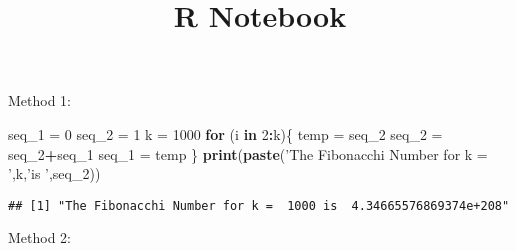 \documentclass[
]{article}
\title{R Notebook}
\author{}
\date{\vspace{-2.5em}}
\newenvironment{Shaded}{\begin{snugshade}}{\end{snugshade}}
\newcommand{\ControlFlowTok}[1]{\textcolor[rgb]{0.13,0.29,0.53}{\textbf{#1}}}
\newcommand{\DataTypeTok}[1]{\textcolor[rgb]{0.13,0.29,0.53}{#1}}
\newcommand{\DecValTok}[1]{\textcolor[rgb]{0.00,0.00,0.81}{#1}}
\newcommand{\KeywordTok}[1]{\textcolor[rgb]{0.13,0.29,0.53}{\textbf{#1}}}
\newcommand{\NormalTok}[1]{#1}
\newcommand{\OperatorTok}[1]{\textcolor[rgb]{0.81,0.36,0.00}{\textbf{#1}}}
\newcommand{\OtherTok}[1]{\textcolor[rgb]{0.56,0.35,0.01}{#1}}
\newcommand{\StringTok}[1]{\textcolor[rgb]{0.31,0.60,0.02}{#1}}
\begin{document}
\maketitle

Method 1:

\begin{Shaded}
\begin{Highlighting}[]
\NormalTok{seq_}\DecValTok{1}\NormalTok{ =}\StringTok{ }\DecValTok{0}
\NormalTok{seq_}\DecValTok{2}\NormalTok{ =}\StringTok{ }\DecValTok{1}
\NormalTok{k =}\StringTok{ }\DecValTok{1000}
\ControlFlowTok{for}\NormalTok{ (i }\ControlFlowTok{in} \DecValTok{2}\OperatorTok{:}\NormalTok{k)\{}
\NormalTok{  temp =}\StringTok{ }\NormalTok{seq_}\DecValTok{2}
\NormalTok{  seq_}\DecValTok{2}\NormalTok{ =}\StringTok{ }\NormalTok{seq_}\DecValTok{2}\OperatorTok{+}\NormalTok{seq_}\DecValTok{1}
\NormalTok{  seq_}\DecValTok{1}\NormalTok{ =}\StringTok{ }\NormalTok{temp}
\NormalTok{\}}
\KeywordTok{print}\NormalTok{(}\KeywordTok{paste}\NormalTok{(}\StringTok{'The Fibonacchi Number for k = '}\NormalTok{,k,}\StringTok{'is '}\NormalTok{,seq_}\DecValTok{2}\NormalTok{))}
\end{Highlighting}
\end{Shaded}

\begin{verbatim}
## [1] "The Fibonacchi Number for k =  1000 is  4.34665576869374e+208"
\end{verbatim}

Method 2:

\begin{Shaded}
\end{Shaded}
\end{document}
